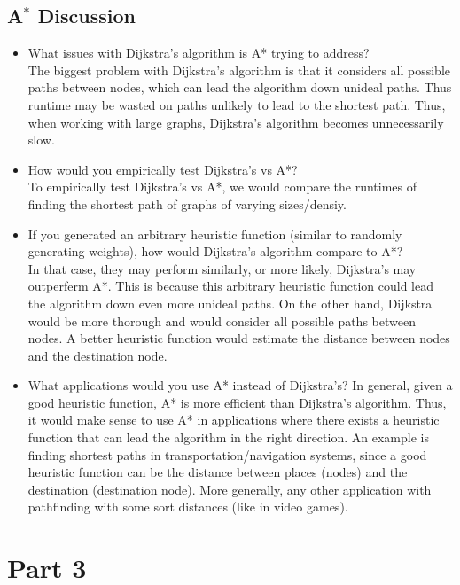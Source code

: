 \documentclass{article}
\begin{document}
\subsection{A$^{*}$ Discussion}
\begin{itemize}
    \item What issues with Dijkstra’s algorithm is A* trying to address?\\
        The biggest problem with Dijkstra’s algorithm is that it considers all possible paths between nodes, which can lead the algorithm down unideal paths. Thus runtime may be wasted on paths unlikely to lead to the shortest path. 
        Thus, when working with large graphs, Dijkstra’s algorithm becomes unnecessarily slow. 
    \item How would you empirically test Dijkstra’s vs A*?\\
        To empirically test Dijkstra’s vs A*, we would compare the runtimes of finding the shortest path of graphs of varying sizes/densiy. 
    \item If you generated an arbitrary heuristic function (similar to randomly generating weights), how would Dijkstra’s algorithm compare to A*?\\
        In that case, they may perform similarly, or more likely, Dijkstra’s may outperferm A*. This is because this arbitrary heuristic function could lead the algorithm down even more unideal paths. On the other hand, Dijkstra would be more thorough and would consider all possible paths between nodes. A better heuristic function would estimate the distance between nodes and the destination node. 
    \item What applications would you use A* instead of Dijkstra’s?
        In general, given a good heuristic function, A* is more efficient than Dijkstra’s algorithm. Thus, it would make sense to use A* in applications where there exists a heuristic function that can lead the algorithm in the right direction. 
        An example is finding shortest paths in transportation/navigation systems, since a good heuristic function can be the distance between places (nodes) and the destination (destination node). More generally, any other application with pathfinding with some sort distances (like in video games). 

\end{itemize}


\newpage
\section{Part 3}
\end{document}
